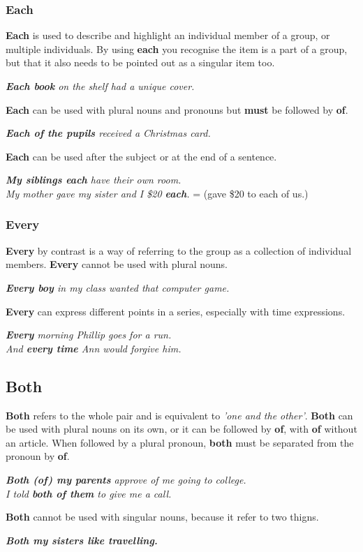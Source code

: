 \documentclass[hidelinks,10pt,a4paper]{article}
\begin{document}
\subsubsection{Each}
\textbf{Each} is used to describe and highlight an individual member of a group, or multiple individuals. By using \textbf{each} you recognise the item is a part of a group, but that it also needs to be pointed out as a singular item too.
\begin{center}
\textit{ \textbf{Each book} on the shelf had a unique cover.}
\end{center}
\textbf{Each} can be used with plural nouns and pronouns but \textbf{must} be followed by \textbf{of}.
\begin{center}
\textit{ \textbf{Each of the pupils} received a Christmas card.}
\end{center}
\textbf{Each} can be used after the subject or at the end of a sentence.
\begin{center}
\textit{ \textbf{My siblings each} have their own room.\\
My mother gave my sister and I \$20 \textbf{each}.} = (gave \$20 to each of us.)
\end{center}
\subsubsection{Every}
\textbf{Every} by contrast is a way of referring to the group as a collection of individual members. \textbf{Every} cannot be used with plural nouns.
\begin{center}
\textit{  \textbf{Every boy} in my class wanted that computer game.}
\end{center}
\textbf{Every} can express different points in a series, especially with time expressions.
\begin{center}
\textit{ \textbf{Every} morning Phillip goes for a run.\\
And \textbf{every time} Ann would forgive him.}
\end{center}

\subsection{Both}
\textbf{Both} refers to the whole pair and is equivalent to \textit{'one and the other'}. \textbf{Both} can be used with plural nouns on its own, or it can be followed by \textbf{of}, with \textbf{of} without an article. When followed by a plural pronoun, \textbf{both} must be separated from the pronoun by \textbf{of}.
\begin{center}
		\textit{ \textbf{Both (of) my parents} approve of me going to college.\\
		I told \textbf{both of them} to give me a call.}
\end{center}
\textbf{Both} cannot be used with singular nouns, because it refer to two thigns.
\begin{center}
\textit{  \textbf{Both my sisters like travelling.}}
\end{center}
\end{document}
